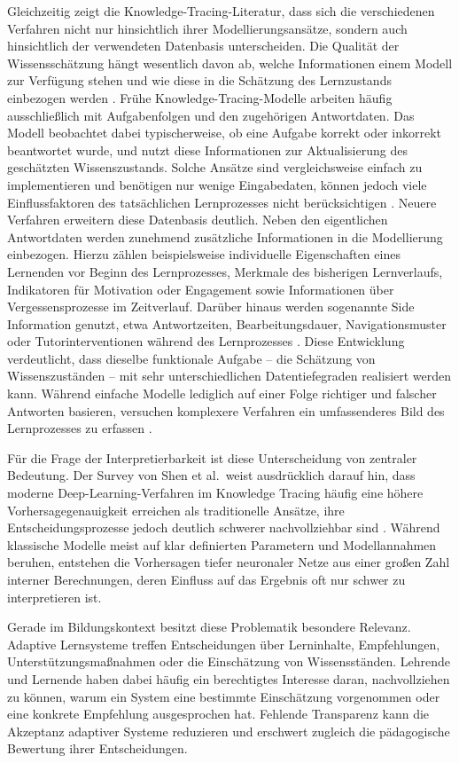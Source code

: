 Gleichzeitig zeigt die Knowledge-Tracing-Literatur, dass sich die
verschiedenen Verfahren nicht nur hinsichtlich ihrer
Modellierungsansätze, sondern auch hinsichtlich der verwendeten
Datenbasis unterscheiden. Die Qualität der Wissensschätzung hängt
wesentlich davon ab, welche Informationen einem Modell zur Verfügung
stehen und wie diese in die Schätzung des Lernzustands einbezogen werden
\citep{Shen2024}. Frühe Knowledge-Tracing-Modelle arbeiten häufig
ausschließlich mit Aufgabenfolgen und den zugehörigen Antwortdaten. Das
Modell beobachtet dabei typischerweise, ob eine Aufgabe korrekt oder
inkorrekt beantwortet wurde, und nutzt diese Informationen zur
Aktualisierung des geschätzten Wissenszustands. Solche Ansätze sind
vergleichsweise einfach zu implementieren und benötigen nur wenige
Eingabedaten, können jedoch viele Einflussfaktoren des tatsächlichen
Lernprozesses nicht berücksichtigen \citep{Shen2024}. Neuere Verfahren
erweitern diese Datenbasis deutlich. Neben den eigentlichen Antwortdaten
werden zunehmend zusätzliche Informationen in die Modellierung
einbezogen. Hierzu zählen beispielsweise individuelle Eigenschaften
eines Lernenden vor Beginn des Lernprozesses, Merkmale des bisherigen
Lernverlaufs, Indikatoren für Motivation oder Engagement sowie
Informationen über Vergessensprozesse im Zeitverlauf. Darüber hinaus
werden sogenannte Side Information genutzt, etwa Antwortzeiten,
Bearbeitungsdauer, Navigationsmuster oder Tutorinterventionen während
des Lernprozesses \citep{Shen2024}. Diese Entwicklung verdeutlicht, dass
dieselbe funktionale Aufgabe -- die Schätzung von Wissenszuständen --
mit sehr unterschiedlichen Datentiefegraden realisiert werden kann.
Während einfache Modelle lediglich auf einer Folge richtiger und
falscher Antworten basieren, versuchen komplexere Verfahren ein
umfassenderes Bild des Lernprozesses zu erfassen \citep{Shen2024}.

Für die Frage der Interpretierbarkeit ist diese Unterscheidung von
zentraler Bedeutung. Der Survey von Shen et al.~weist ausdrücklich
darauf hin, dass moderne Deep-Learning-Verfahren im Knowledge Tracing
häufig eine höhere Vorhersagegenauigkeit erreichen als traditionelle
Ansätze, ihre Entscheidungsprozesse jedoch deutlich schwerer
nachvollziehbar sind \citep{Shen2024}. Während klassische Modelle meist
auf klar definierten Parametern und Modellannahmen beruhen, entstehen
die Vorhersagen tiefer neuronaler Netze aus einer großen Zahl interner
Berechnungen, deren Einfluss auf das Ergebnis oft nur schwer zu
interpretieren ist.

Gerade im Bildungskontext besitzt diese Problematik besondere Relevanz.
Adaptive Lernsysteme treffen Entscheidungen über Lerninhalte,
Empfehlungen, Unterstützungsmaßnahmen oder die Einschätzung von
Wissensständen. Lehrende und Lernende haben dabei häufig ein
berechtigtes Interesse daran, nachvollziehen zu können, warum ein System
eine bestimmte Einschätzung vorgenommen oder eine konkrete Empfehlung
ausgesprochen hat. Fehlende Transparenz kann die Akzeptanz adaptiver
Systeme reduzieren und erschwert zugleich die pädagogische Bewertung
ihrer Entscheidungen.


